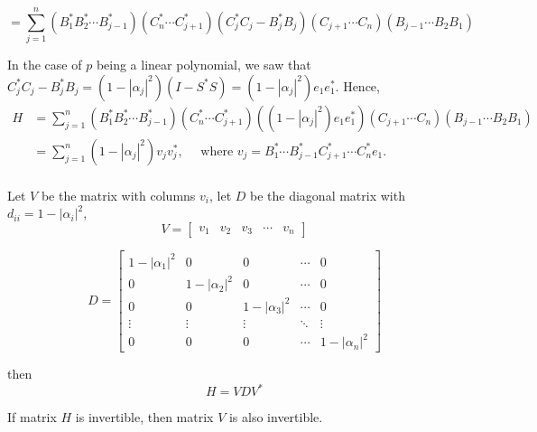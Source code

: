 \documentclass[twofold]{article}
\newcommand*\adj[1]{#1^*}
\newcommand*\abs[1]{\left \vert #1 \right\vert}
\theoremstyle{plain}
\theoremstyle{definition}
\theoremstyle{remark}
\begin{document}
\[= \sum_{j = 1} ^n (\adj{B_1} \adj{B_2} \cdots \adj{B_{j-1}})(\adj{C_{n}} \cdots \adj{C_{j+1}}) (\adj{C_j} C_j - \adj{B_j} B_j) (C_{j+1} \cdots C_n) (B_{j-1} \cdots B_2 B_1) \]


In the case of \(p\) being a linear polynomial, we saw that \(\adj{C_j} C_j - \adj{B_j} B_j  = (1 - \abs{\alpha_j}^2) (I - \adj{S} S)  = (1 - \abs{\alpha_j}^2) e_1 \adj{e_1}\). Hence, 
\begin{equation*}\begin{split}
H & = \sum_{j = 1} ^n (\adj{B_1} \adj{B_2} \cdots \adj{B_{j-1}})(\adj{C_{n}} \cdots \adj{C_{j+1}}) ((1-\abs{\alpha_j}^2) e_1 \adj{e_1}) (C_{j+1} \cdots C_n) (B_{j-1} \cdots B_2 B_1) \\
& =  \sum_{j=1} ^n (1-\abs{\alpha_j}^2) v_j \adj{v_j}, \quad \text{ where } v_j = \adj{B_1} \cdots \adj{B_{j-1}} \adj{C_{j+1}} \cdots \adj{C_n} e_1.\\
\end{split} \end{equation*}

Let \(V\) be the matrix with columns \(v_i\), let \(D\) be the diagonal matrix with \(d_{ii} = 1 - \abs{\alpha_i}^2\), 
\[V = \begin{bmatrix} v_1 & v_2 & v_3 & \cdots & v_n \end{bmatrix} \]

\[D = \begin{bmatrix} 1 - \abs{\alpha_1}^2 & 0 & 0 & \cdots & 0 \\
0 & 1 - \abs{\alpha_2}^2 & 0 & \cdots & 0 \\
0 & 0 & 1- \abs{\alpha_3}^2 & \cdots & 0 \\
\vdots & \vdots & \vdots & \ddots& \vdots \\
0 & 0 & 0 & \cdots & 1 - \abs{\alpha_n}^2 \end{bmatrix}\]

then 
\[H = V D \adj{V}\]

If matrix \(H\) is invertible, then matrix \(V\) is also invertible. 
\end{document}
